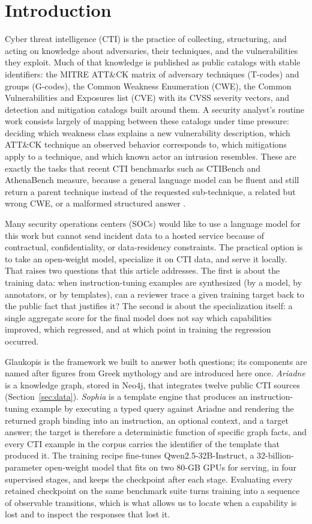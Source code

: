 \documentclass[twocolumn]{svjour3}
\begin{document}
\section{Introduction}\label{sec:intro}
Cyber threat intelligence (CTI) is the practice of collecting, structuring, and acting on knowledge about adversaries, their techniques, and the vulnerabilities they exploit. Much of that knowledge is published as public catalogs with stable identifiers: the MITRE ATT\&CK matrix of adversary techniques (T-codes) and groups (G-codes), the Common Weakness Enumeration (CWE), the Common Vulnerabilities and Exposures list (CVE) with its CVSS severity vectors, and detection and mitigation catalogs built around them. A security analyst's routine work consists largely of mapping between these catalogs under time pressure: deciding which weakness class explains a new vulnerability description, which ATT\&CK technique an observed behavior corresponds to, which mitigations apply to a technique, and which known actor an intrusion resembles. These are exactly the tasks that recent CTI benchmarks such as CTIBench and AthenaBench measure, because a general language model can be fluent and still return a parent technique instead of the requested sub-technique, a related but wrong CWE, or a malformed structured answer \cite{alam2024ctibench,alam2025athenabench}.

Many security operations centers (SOCs) would like to use a language model for this work but cannot send incident data to a hosted service because of contractual, confidentiality, or data-residency constraints. The practical option is to take an open-weight model, specialize it on CTI data, and serve it locally. That raises two questions that this article addresses. The first is about the training data: when instruction-tuning examples are synthesized (by a model, by annotators, or by templates), can a reviewer trace a given training target back to the public fact that justifies it? The second is about the specialization itself: a single aggregate score for the final model does not say which capabilities improved, which regressed, and at which point in training the regression occurred.

Glaukopis is the framework we built to answer both questions; its components are named after figures from Greek mythology and are introduced here once. \emph{Ariadne} is a knowledge graph, stored in Neo4j, that integrates twelve public CTI sources (Section~\ref{sec:data}). \emph{Sophia} is a template engine that produces an instruction-tuning example by executing a typed query against Ariadne and rendering the returned graph binding into an instruction, an optional context, and a target answer; the target is therefore a deterministic function of specific graph facts, and every CTI example in the corpus carries the identifier of the template that produced it. The training recipe fine-tunes Qwen2.5-32B-Instruct, a 32-billion-parameter open-weight model that fits on two 80-GB GPUs for serving, in four supervised stages, and keeps the checkpoint after each stage. Evaluating every retained checkpoint on the same benchmark suite turns training into a sequence of observable transitions, which is what allows us to locate when a capability is lost and to inspect the responses that lost it.
\end{document}
